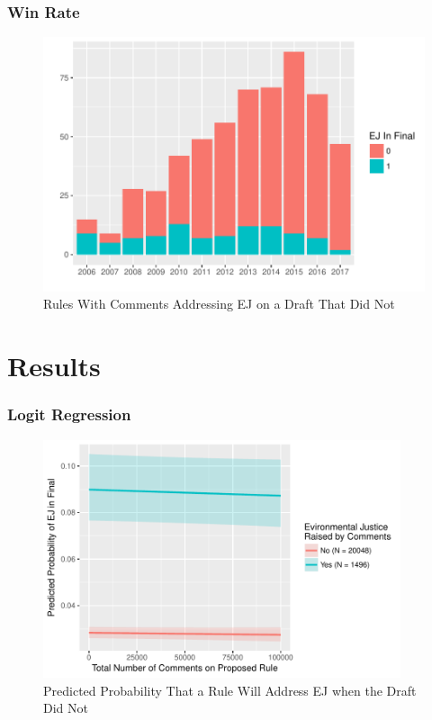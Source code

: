 \documentclass[10pt]{beamer}
\begin{document}
\begin{frame}
\frametitle{Win Rate}
\begin{figure}
\caption{Rules With Comments Addressing EJ on a Draft That Did Not}
\includegraphics[width = \textwidth/2]{ej_win_rate.pdf}
\end{figure}
\end{frame}

\section{Results}

\begin{frame}
\frametitle{Logit Regression}
\begin{figure}
\caption{Predicted Probability That a Rule Will Address EJ when the Draft Did Not}
\includegraphics[height = 7cm]{ej_prob_env_nprms.pdf}
\end{figure}
\end{frame}
\end{document}
